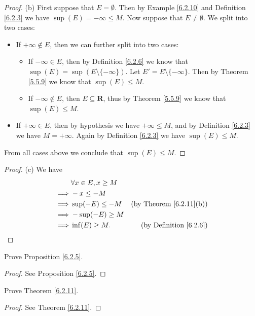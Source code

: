 \begin{proof}{(b)}
    First suppose that \(E = \emptyset\).
    Then by Example \ref{6.2.10} and Definition \ref{6.2.3} we have \(\sup(E) = -\infty \leq M\).
    Now suppose that \(E \neq \emptyset\).
    We split into two cases:
    \begin{itemize}
        \item If \(+\infty \not\in E\), then we can further split into two cases:
              \begin{itemize}
                  \item If \(-\infty \in E\), then by Definition \ref{6.2.6} we know that \(\sup(E) = \sup(E \setminus \{-\infty\})\).
                        Let \(E' = E \setminus \{-\infty\}\).
                        Then by Theorem \ref{5.5.9} we know that \(\sup(E) \leq M\).
                  \item If \(-\infty \notin E\), then \(E \subseteq \mathbf{R}\), thus by Theorem \ref{5.5.9} we know that \(\sup(E) \leq M\).
              \end{itemize}
        \item If \(+\infty \in E\), then by hypothesis we have \(+\infty \leq M\), and by Definition \ref{6.2.3} we have \(M = +\infty\).
              Again by Definition \ref{6.2.3} we have \(\sup(E) \leq M\).
    \end{itemize}
    From all cases above we conclude that \(\sup(E) \leq M\).
\end{proof}

\begin{proof}{(c)}
    We have
    \begin{align*}
                 & \forall x \in E, x \geq M                                       \\
        \implies & -x \leq -M                                                      \\
        \implies & \sup(-E) \leq -M          & \text{(by Theorem \ref{6.2.11}(b))} \\
        \implies & -\sup(-E) \geq M                                                \\
        \implies & \inf(E) \geq M.           & \text{(by Definition \ref{6.2.6})}
    \end{align*}
\end{proof}

\exercisesection

\begin{exercise}\label{ex 6.2.1}
    Prove Proposition \ref{6.2.5}.
\end{exercise}

\begin{proof}
    See Proposition \ref{6.2.5}.
\end{proof}

\begin{exercise}\label{ex 6.2.2}
    Prove Theorem \ref{6.2.11}.
\end{exercise}

\begin{proof}
    See Theorem \ref{6.2.11}.
\end{proof}